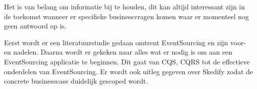 Het is van belang om informatie bij te houden, dit kan altijd interessant zijn in de toekomst wanneer er specifieke businessvragen komen waar er momenteel nog geen antwoord op is.

Eerst wordt er een literatuurstudie gedaan omtrent EventSourcing en zijn voor- en nadelen.
Daarna wordt er gekeken naar alles wat er nodig is om aan een EventSourcing applicatie te beginnen. Dit gaat van \gls{CQS}, \gls{CQRS} tot de effectieve onderdelen van EventSourcing. Er wordt ook uitleg gegeven over Skedify zodat de concrete businesscase duidelijk gescoped wordt.

